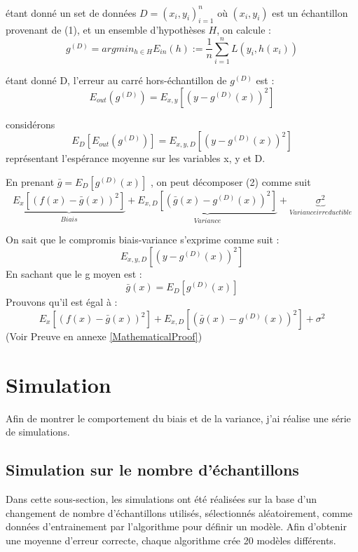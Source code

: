 \documentclass[a4paper]{article}
\begin{document}
étant donné un set de données $D = {(x_i, y_i)}^n_{i=1}$ où $(x_i, y_i)$ est un échantillon provenant de (1), et un ensemble d'hypothèses $H$, on calcule : \newline
\[ g^{(D)} = argmin_{h\in H}  E_{in}(h) := \frac{1}{n} \sum_{i=1}^{n} L(y_i,h(x_i)) \]

étant donné D, l'erreur au carré hors-échantillon de $g^{(D)}$ est : \newline
\[ E_{out}(g^{(D)}) = E_{x,y}[(y - g^{(D)}(x))^2] \]

considérons 
\begin{equation}
E_D[E_{out}(g^{(D)})] = E_{x,y,D}[(y - g^{(D)}(x))^2]
\end{equation}
représentant l'espérance moyenne sur les variables x, y et D. \newline

En prenant $ \bar{g} = E_D[g^{(D)}(x)]$ , on peut décomposer (2) comme suit 
\[ \underbrace{E_x[(f(x) - \bar{g}(x))^2]}_{Biais} + \underbrace{E_{x,D}[(\bar{g}(x) - g^{(D)}(x))^2]}_{Variance} + \underbrace{\sigma^2}_{Variance irreductible} \]

\newpage

On sait que le compromis biais-variance s'exprime comme suit : 
\[ E_{x,y,D}[(y-g^{(D)}(x))^2] \]
En sachant que le g moyen est :
\begin{equation}
\label{g_moyen}
\bar{g}(x) = E_D [g^{(D)}(x)]
\end{equation}
Prouvons qu'il est égal à :
\[ E_x[(f(x) - \bar{g}(x))^2] + E_{x,D}[(\bar{g}(x) - g^{(D)}(x))^2] + \sigma^2 \]
(Voir Preuve en annexe \ref{MathematicalProof})

\newpage

\section{Simulation}
Afin de montrer le comportement du biais et de la variance, j'ai réalise une série de simulations.

\subsection{Simulation sur le nombre d'échantillons}
Dans cette sous-section, les simulations ont été réalisées sur la base d'un changement de nombre d'échantillons utilisés, sélectionnés aléatoirement, comme données d'entrainement par l'algorithme pour définir un modèle. Afin d'obtenir une moyenne d'erreur correcte, chaque algorithme crée 20 modèles différents. \newline
\end{document}
